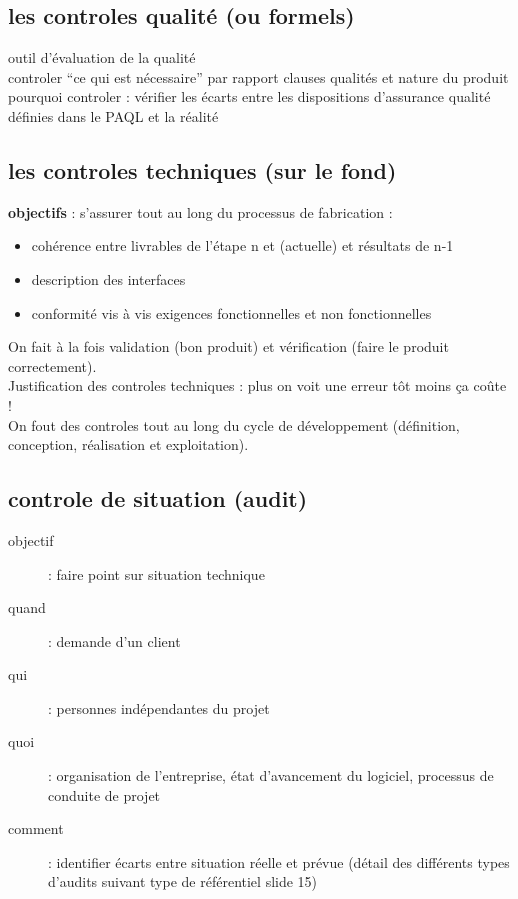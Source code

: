 	\subsection{les controles qualité (ou formels)}

outil d’évaluation de la qualité\\
controler “ce qui est nécessaire” par rapport clauses qualités et nature du produit\\
pourquoi controler : vérifier les écarts entre les dispositions d’assurance qualité définies dans le PAQL et la réalité

	\subsection{les controles techniques (sur le fond)}
\textbf{objectifs} : s’assurer tout au long du processus de fabrication :
\begin{itemize}
\item cohérence entre livrables de l’étape n et (actuelle) et résultats de n-1
\item description des interfaces
\item conformité vis à vis exigences fonctionnelles et non fonctionnelles
\end{itemize}

On fait à la fois validation (bon produit) et vérification (faire le produit correctement).\\
Justification des controles techniques : plus on voit une erreur tôt moins ça coûte !\\
On fout des controles tout au long du cycle de développement (définition, conception, réalisation et exploitation).

	\subsection{controle de situation (audit)}
	\begin{description}
	\item[objectif] : faire point sur situation technique
	\item[quand] : demande d’un client
	\item[qui] : personnes indépendantes du projet
	\item[quoi] : organisation de l’entreprise, état d’avancement du logiciel, processus de conduite de projet
	\item[comment] : identifier écarts entre situation réelle et prévue
(détail des différents types d’audits suivant type de référentiel slide 15)
	\end{description}

